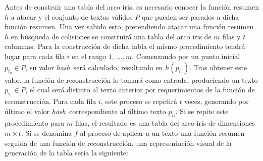 \documentclass[12pt,spanish,listoffigures,listoftables,listofalgorithms]{tfgetsinf}
\newcommand{\hash}{\textit{hash}}
\begin{document}
Antes de construir una tabla del arco iris, es necesario conocer la función resumen $h$ a atacar y el conjunto de textos válidos $P$ que pueden ser pasados a dicha función resumen. Una vez sabido esto, pretendiendo atacar una función resumen $h$ en búsqueda de colisiones se construirá una tabla del arco iris de $m$ filas y $t$ columnas. Para la construcción de dicha tabla el mismo procedimiento tendrá lugar para cada fila $i$ en el rango $1,~\dots, m$. Comenzando por un punto inicial $p_{i_0} \in P$, su valor \hash~será calculado, resultando en $h(p_{i_0})$. Tras obtener este valor, la función de reconstrucción lo tomará como entrada, produciendo un texto $p_{i_1} \in P$, el cual será distinto al texto anterior por requerimientos de la función de reconstrucción. Para cada fila $i$, este proceso se repetirá $t$ veces, generando por último el valor \hash~correspondiente al último texto $p_{i_t}$. Si se repite este procedimiento para $m$ filas, el resultado es una tabla del arco iris de dimensiones $m \times t$. Si se denomina $f$ al proceso de aplicar a un texto una función resumen seguida de una función de reconstrucción, una representación visual de la generación de la tabla sería la siguiente:
\end{document}
